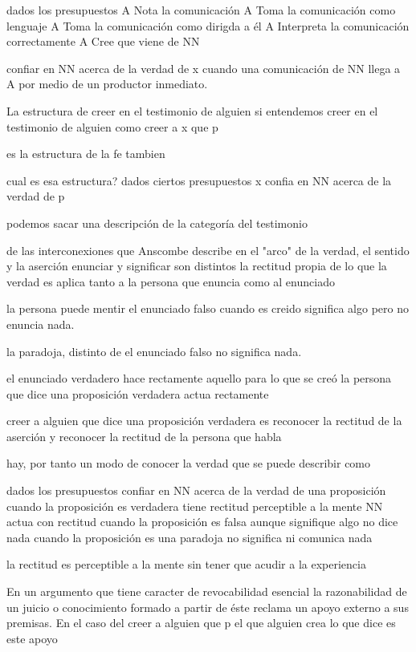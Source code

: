 dados los presupuestos
A Nota la comunicación
A Toma la comunicación como lenguaje
A Toma la comunicación como dirigda a él
A Interpreta la comunicación correctamente
A Cree que viene de NN

confiar en NN acerca de la verdad de x cuando una comunicación de NN llega a A por medio de un productor inmediato.

La estructura de creer en el testimonio de alguien
si entendemos creer en el testimonio de alguien como
creer a x que p

es la estructura de la fe tambien

cual es esa estructura?
dados ciertos presupuestos
x confia en NN acerca de la verdad de p

podemos sacar una descripción de
la categoría del testimonio

de las interconexiones que Anscombe describe
en el "arco" de la verdad, el sentido y la aserción
enunciar y significar son distintos
la rectitud propia de lo que la verdad es aplica tanto a la persona que enuncia como al enunciado

la persona puede mentir
el enunciado falso cuando es creido significa algo pero no enuncia nada.

la paradoja, distinto de el enunciado falso no significa nada.

el enunciado verdadero hace rectamente aquello para lo que se creó
la persona que dice una proposición verdadera actua rectamente

creer a alguien que dice una proposición verdadera es reconocer la rectitud de la aserción y reconocer la rectitud de la persona que habla

hay, por tanto un modo de conocer la verdad que se puede describir como

dados los presupuestos
confiar en NN acerca de la verdad de una proposición
cuando la proposición es verdadera tiene rectitud perceptible a la mente
NN actua con rectitud
cuando la proposición es falsa aunque signifique algo no dice nada
cuando la proposición es una paradoja no significa ni comunica nada

la rectitud es perceptible a la mente sin tener que acudir a la experiencia



En un argumento que tiene caracter de revocabilidad esencial la razonabilidad de un juicio o conocimiento formado a partir de éste reclama un apoyo externo a sus premisas. En el caso del creer a alguien que p el que alguien crea lo que dice es este apoyo

